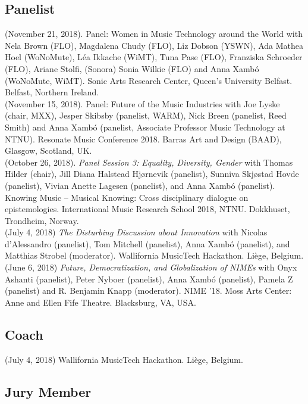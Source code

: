 \documentclass[10pt, a4paper]{article}
\newcommand{\years}[1]{\marginnote{\scriptsize #1}}
\begin{document}
\subsection*{Panelist}
\noindent
\years{2018e}(November 21, 2018). Panel: Women in Music Technology around the World with Nela Brown (FLO), Magdalena Chudy (FLO), Liz Dobson (YSWN), Ada Mathea Hoel (WoNoMute), Léa Ikkache (WiMT), Tuna Pase (FLO), Franziska Schroeder (FLO), Ariane Stolfi, (Sonora) Sonia Wilkie (FLO) and Anna Xambó (WoNoMute, WiMT). Sonic Arts Research Center, Queen's University Belfast. Belfast, Northern Ireland.\\
\years{2018d}(November 15, 2018). Panel: Future of the Music Industries with Joe Lyske (chair, MXX), Jesper Skibsby (panelist, WARM), Nick Breen (panelist, Reed Smith) and Anna Xambó (panelist, Associate Professor Music Technology at NTNU). Resonate Music Conference 2018. Barras Art and Design (BAAD), Glasgow, Scotland, UK.\\
\years{2018c}(October 26, 2018). \emph{Panel Session 3: Equality, Diversity, Gender} with Thomas Hilder (chair), Jill Diana Halstead Hjørnevik (panelist), Sunniva Skjøstad Hovde (panelist), Vivian Anette Lagesen (panelist), and Anna Xambó (panelist). Knowing Music -- Musical Knowing: Cross disciplinary dialogue on epistemologies. International Music Research School 2018, NTNU. Dokkhuset, Trondheim, Norway.\\
\years{2018b}(July 4, 2018) \emph{The Disturbing Discussion about Innovation} with Nicolas d'Alessandro (panelist), Tom Mitchell (panelist), Anna Xambó (panelist), and Matthias Strobel (moderator). Wallifornia MusicTech Hackathon. Liège, Belgium.\\
\years{2018a}(June 6, 2018) \emph{Future, Democratization, and Globalization of NIMEs} with Onyx Ashanti (panelist), Peter Nyboer (panelist), Anna Xambó (panelist), Pamela Z (panelist) and R. Benjamin Knapp (moderator). NIME '18. Moss Arts Center: Anne and Ellen Fife Theatre. Blacksburg, VA, USA.

\subsection*{Coach}
\noindent

\years{2018}(July 4, 2018) Wallifornia MusicTech Hackathon. Liège, Belgium.

\subsection*{Jury Member}
\noindent
\end{document}
